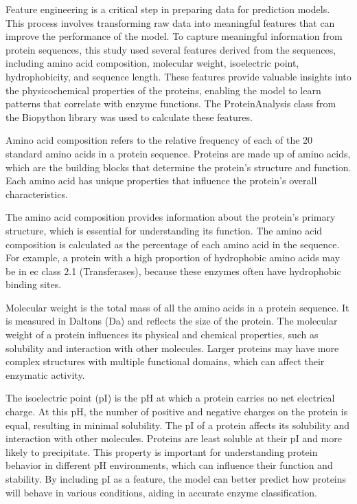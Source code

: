 Feature engineering is a critical step in preparing data for prediction models. This process involves transforming raw data into meaningful features that can improve the performance of the model. To capture meaningful information from protein sequences, this study used several features derived from the sequences, including amino acid composition, molecular weight, isoelectric point, hydrophobicity, and sequence length. These features provide valuable insights into the physicochemical properties of the proteins, enabling the model to learn patterns that correlate with enzyme functions. The ProteinAnalysis class from the Biopython library was used to calculate these features.

Amino acid composition refers to the relative frequency of each of the 20 standard amino acids in a protein sequence. Proteins are made up of amino acids, which are the building blocks that determine the protein's structure and function. Each amino acid has unique properties that influence the protein's overall characteristics. \autocite{ProteinStructureLearn}

The amino acid composition provides information about the protein's primary structure, which is essential for understanding its function. The amino acid composition is calculated as the percentage of each amino acid in the sequence. For example, a protein with a high proportion of hydrophobic amino acids may be in ec class 2.1 (Transferases), because these enzymes often have hydrophobic binding sites. \autocite{lightTransferaseHydrolaseRole2017}

Molecular weight is the total mass of all the amino acids in a protein sequence. It is measured in Daltons (Da) and reflects the size of the protein. The molecular weight of a protein influences its physical and chemical properties, such as solubility and interaction with other molecules. Larger proteins may have more complex structures with multiple functional domains, which can affect their enzymatic activity.

The isoelectric point (pI) is the pH at which a protein carries no net electrical charge. At this pH, the number of positive and negative charges on the protein is equal, resulting in minimal solubility. The pI of a protein affects its solubility and interaction with other molecules. Proteins are least soluble at their pI and more likely to precipitate. This property is important for understanding protein behavior in different pH environments, which can influence their function and stability. By including pI as a feature, the model can better predict how proteins will behave in various conditions, aiding in accurate enzyme classification.

